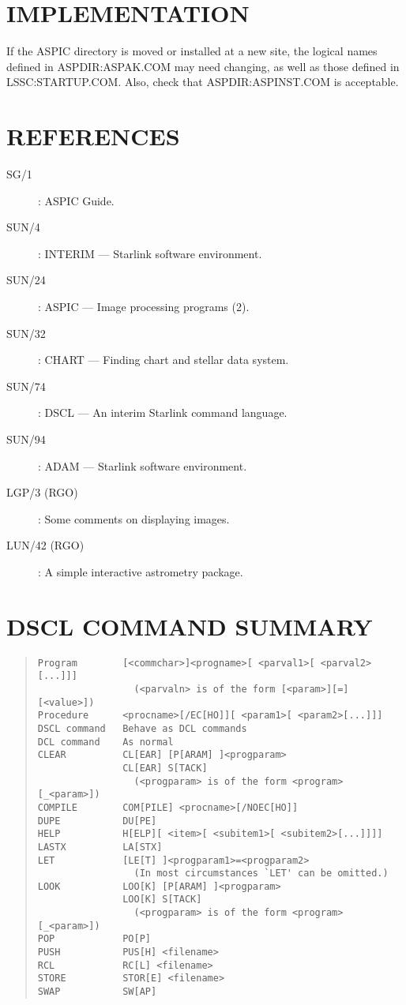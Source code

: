 \section {IMPLEMENTATION}

If the ASPIC directory is moved or installed at a new site, the logical names
defined in ASPDIR:ASPAK.COM may need changing, as well as those defined in
LSSC:STARTUP.COM.
Also, check that ASPDIR:ASPINST.COM is acceptable.

\section {REFERENCES}

\begin{description}
\begin{description}
\item [SG/1]: ASPIC Guide.
\item [SUN/4]: INTERIM --- Starlink software environment.
\item [SUN/24]: ASPIC --- Image processing programs (2).
\item [SUN/32]: CHART --- Finding chart and stellar data system.
\item [SUN/74]: DSCL --- An interim Starlink command language.
\item [SUN/94]: ADAM --- Starlink software environment.
\item [LGP/3 (RGO)]: Some comments on displaying images.
\item [LUN/42 (RGO)]: A simple interactive astrometry package.
\end{description}
\end{description}
\appendix

\section {DSCL COMMAND SUMMARY}

\begin{quote}
\begin{verbatim}
Program        [<commchar>]<progname>[ <parval1>[ <parval2>[...]]]
                 (<parvaln> is of the form [<param>][=][<value>])
Procedure      <procname>[/EC[HO]][ <param1>[ <param2>[...]]]
DSCL command   Behave as DCL commands
DCL command    As normal
CLEAR          CL[EAR] [P[ARAM] ]<progparam>
               CL[EAR] S[TACK]
                 (<progparam> is of the form <program>[_<param>])
COMPILE        COM[PILE] <procname>[/NOEC[HO]]
DUPE           DU[PE]
HELP           H[ELP][ <item>[ <subitem1>[ <subitem2>[...]]]]
LASTX          LA[STX]
LET            [LE[T] ]<progparam1>=<progparam2>
                 (In most circumstances `LET' can be omitted.)
LOOK           LOO[K] [P[ARAM] ]<progparam>
               LOO[K] S[TACK]
                 (<progparam> is of the form <program>[_<param>])
POP            PO[P]
PUSH           PUS[H] <filename>
RCL            RC[L] <filename>
STORE          STOR[E] <filename>
SWAP           SW[AP]
\end{verbatim}
\end{quote}
\newpage

